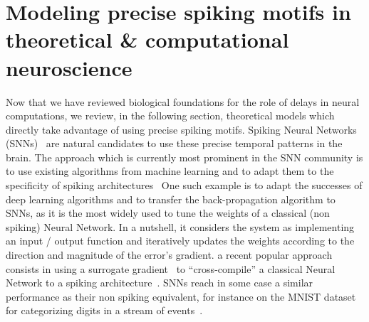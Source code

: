 \documentclass[brainsci, %
               review,submit,pdftex,moreauthors
               ]{Definitions/mdpi}
\begin{document}
\section{Modeling precise spiking motifs in theoretical \& computational neuroscience}
Now that we have reviewed biological foundations for the role of delays in neural computations, we review, in the following section, theoretical models which directly take advantage of using precise spiking motifs. 
Spiking Neural Networks (SNNs)~\citep{maass_networks_1997} are natural candidates to use these precise temporal patterns in the brain. The approach which is currently most prominent in the SNN community is to use existing algorithms from machine learning and to adapt them to the specificity of spiking architectures~\citep{goltz_fast_2021} One such example is to adapt the successes of deep learning algorithms and to transfer the back-propagation algorithm to SNNs, as it is the most widely used to tune the weights of a classical (non spiking) Neural Network. In a nutshell, it considers the system as implementing an input / output function and iteratively updates the weights according to the direction and magnitude of the error's gradient.  a recent popular approach consists in using a surrogate gradient~\citep{neftci_surrogate_2019} to ``cross-compile'' a classical Neural Network to a spiking architecture~\citep{rueckauer_conversion_2017}. SNNs reach in some case a similar performance as their non spiking equivalent, for instance on the MNIST dataset for categorizing digits in a stream of events~\citep{susi_nmnsd-spiking_2021}. 
\end{document}
